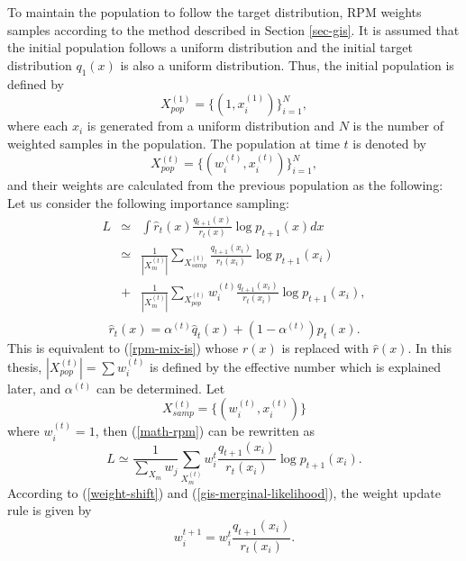 To maintain the population to follow the target distribution, 
RPM weights samples according to the method described
in Section \ref{sec-gis}.
It is assumed that 
the initial population follows a uniform distribution and
the initial target distribution $q_1(x)$ is also a uniform distribution.
Thus, the initial population is defined by
\[
 X_{pop}^{(1)}=\{(1,x_i^{(1)})\}_{i=1}^{N},
\]
where each $x_i$ is generated
from a uniform distribution and 
$N$ is the number of weighted samples in the population.
The population at time $t$ is denoted by
\[
 X^{(t)}_{pop}=\{(w^{(t)}_i,x^{(t)}_i)\}_{i=1}^{N},
\]
and their weights are calculated from the previous population as the following:
Let us consider the following importance sampling:
\begin{eqnarray}
 L&\simeq&\int \hat r_{t}(x)
\frac{q_{t+1}(x)}{r_{t}(x)}\log p_{t+1}(x) dx\\
&\simeq& \frac{1}{|X_m^{(t)}|}\sum_{X_{samp}^{(t)}}\frac{q_{t+1}(x_i)}{r_{t}(x_i)}
\log p_{t+1}(x_i)\nonumber\\
&+& \frac{1}{|X_m^{(t)}|}\sum_{X_{pop}^{(t)}}w_i^{(t)}\frac{q_{t+1}(x_i)}{r_{t}(x_i)}\log
 p_{t+1}(x_i),\nonumber \\
\label{math-rpm}
\end{eqnarray}
\begin{equation}
  \hat r_{t}(x)=\alpha^{(t)} \hat q_{t}(x) + (1-\alpha^{(t)}) p_{t}(x).
\end{equation}
This is equivalent to (\ref{rpm-mix-is}) 
whose $r(x)$ is replaced with $\hat r(x)$.
In this thesis, 
$|X_{pop}^{(t)}|=\sum w_i^{(t)}$ is defined by the effective
number which is explained later, 
and $\alpha^{(t)}$ can be determined.
Let
\[
X_{samp}^{(t)}=\{(w_i^{(t)},x_i^{(t)})\} 
\]
where \mbox{$w_i^{(t)}=1$},
then (\ref{math-rpm}) can be rewritten
as 
\begin{equation}
 L \simeq \frac{1}{\sum_{X_m} w_j}\sum_{X_m^{(t)}}w_i^{t} \frac{q_{t+1}(x_i)}{r_{t}(x_i)}
\log p_{t+1}(x_i).
\label{gis-merginal-likelihood}
\end{equation}
According to (\ref{weight-shift}) and (\ref{gis-merginal-likelihood}),
the weight update rule is given by
\begin{equation}
 w_i^{t+1}=w_i^{t} \frac{q_{t+1}(x_i)}{r_{t}(x_i)}.
\label{weight-update}
\end{equation}


